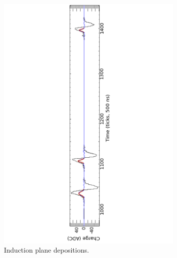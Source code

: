 \begin{figure}
\begin{subfigure}{0.95\textwidth}
    \includegraphics[width=\textwidth]{InductionPlane}
    \caption{Induction plane depositions.}
    \label{fig:LotsOfHits_Ind}
  \end{subfigure}
  \begin{subfigure}{0.95\textwidth}
    \centering

\end{subfigure}
\end{figure}
